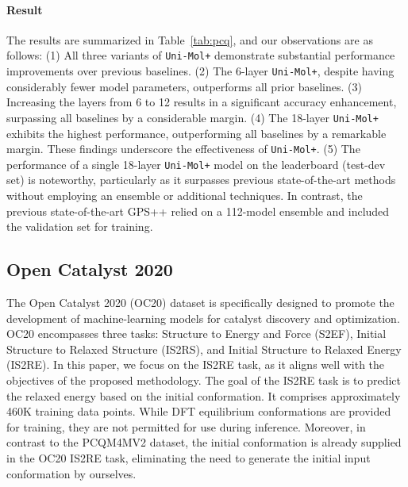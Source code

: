 \documentclass{article}
\newcommand{\name}{\texttt{Uni-Mol+}\xspace}
\begin{document}
\paragraph{Result} 
The results are summarized in Table~\ref{tab:pcq}, and our observations are as follows: (1) All three variants of \name demonstrate substantial performance improvements over previous baselines. (2) The 6-layer \name, despite having considerably fewer model parameters, outperforms all prior baselines. (3) Increasing the layers from 6 to 12 results in a significant accuracy enhancement, surpassing all baselines by a considerable margin. (4) The 18-layer \name exhibits the highest performance, outperforming all baselines by a remarkable margin. These findings underscore the effectiveness of \name. (5) The performance of a single 18-layer \name model on the leaderboard (test-dev set) is noteworthy, particularly as it surpasses previous state-of-the-art methods without employing an ensemble or additional techniques. In contrast, the previous state-of-the-art GPS++ relied on a 112-model ensemble and included the validation set for training.







\subsection{Open Catalyst 2020}


The Open Catalyst 2020 (OC20) dataset \cite{chanussot2021open} is specifically designed to promote the development of machine-learning models for catalyst discovery and optimization. OC20 encompasses three tasks: Structure to Energy and Force (S2EF), Initial Structure to Relaxed Structure (IS2RS), and Initial Structure to Relaxed Energy (IS2RE). In this paper, we focus on the IS2RE task, as it aligns well with the objectives of the proposed methodology. The goal of the IS2RE task is to predict the relaxed energy based on the initial conformation. It comprises approximately 460K training data points. While DFT equilibrium conformations are provided for training, they are not permitted for use during inference. Moreover, in contrast to the PCQM4MV2 dataset, the initial conformation is already supplied in the OC20 IS2RE task, eliminating the need to generate the initial input conformation by ourselves. 
\end{document}
